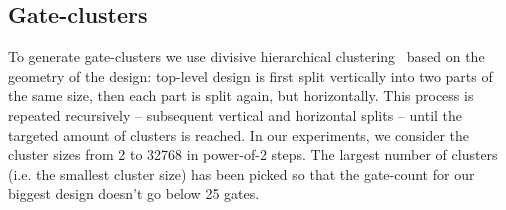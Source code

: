 \documentclass[conference]{IEEEtran}
\begin{document}
\subsection{Gate-clusters}\label{sec:gate-cluster}
To generate gate-clusters we use divisive hierarchical clustering~\cite{Rokach2005} based on the geometry of the design: top-level design is first split vertically into two parts of the same size, then each part is split again, but horizontally. This process is repeated recursively -- subsequent vertical and horizontal splits -- until the targeted amount of clusters is reached. In our experiments, we consider the cluster sizes from 2 to 32768 in power-of-2 steps. The largest number of clusters (i.e. the smallest cluster size) has been picked so that the gate-count for our biggest design doesn't go below 25 gates.
\end{document}
